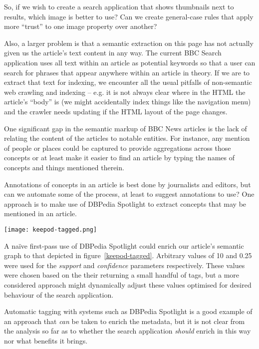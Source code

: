 So, if we wish to create a search application that shows thumbnails next
to results, which image is better to use? Can we create general-case
rules that apply more ``trust'' to one image property over another?

Also, a larger problem is that a semantic extraction on this page
has not actually given us the article's text content in any way. The
current BBC Search application uses all text within an article as
potential keywords so that a user can search for phrases that appear
anywhere within an article in theory. If we are to extract that text
for indexing, we encounter all the usual pitfalls of non-semantic
web crawling and indexing -- e.g. it is not always clear where
in the HTML the article's ``body'' is (we might accidentally index
things like the navigation menu) and the crawler needs updating
if the HTML layout of the page changes.

One significant gap in the semantic markup of BBC News articles is
the lack of relating the content of the articles to notable entities.
For instance, any mention of people or places could be captured
to provide aggregations across those concepts or at least make it
easier to find an article by typing the names of concepts and things
mentioned therein.

Annotations of concepts in an article is best done by journalists
and editors, but can we automate some of the process, at least
to suggest annotations to use? One approach is to make use of
DBPedia Spotlight to extract concepts that may be mentioned in
an article.

\begin{sidewaysfigure}
  \begin{center}
    \texttt{[image: keepod-tagged.png]}
  \end{center}
  \caption{BBC News article page's metadata enriched using DBPedia Spotlight}
  \label{keepod-tagged}
\end{sidewaysfigure}

A na\"ive first-pass use of DBPedia Spotlight could enrich
our article's semantic graph to that depicted in figure~\ref{keepod-tagged}.
Arbitrary values of 10 and 0.25 were used for the \emph{support}
and \emph{confidence} parameters respectively. These values were
chosen based on the their returning a small handful of tags, but
a more considered approach might dynamically adjust these values
optimised for desired behaviour of the search application.

Automatic tagging with systems such as DBPedia Spotlight is a good
example of an approach that \emph{can} be taken to enrich
the metadata, but it is not clear from the analysis so far as to
whether the search application \emph{should} enrich in this way
nor what benefits it brings.

